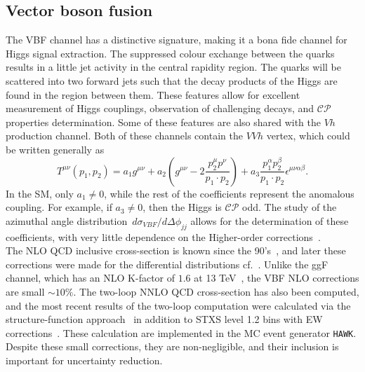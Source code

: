 \subsection{Vector boson fusion}
The VBF channel has a distinctive signature, making it a bona fide channel for Higgs signal extraction. The suppressed colour exchange between the quarks results in a little jet activity in the central rapidity region. The quarks will be scattered into two forward jets such that the decay products of the Higgs are found in the region between them.  These features allow for excellent measurement of Higgs couplings, observation of challenging decays, and $\mathcal{CP}$ properties determination. Some of these features are also shared with the $Vh$ production channel. Both of these channels contain the $VVh$ vertex, which could be written generally as~\cite{LHCHiggsCrossSectionWorkingGroup:2016ypw}
\begin{equation}
	T^{\mu \nu}(p_1,p_2) = a_1 g^{\mu \nu}+ a_2  \left(g^{\mu \nu}- 2\frac{p^\mu_{2} p^\nu }{p_1 \cdot p_2} \right)  + a_3 \frac{p_1^\alpha p_2^ \beta}{p_1 \cdot p_2}\epsilon^{\mu \nu \alpha \beta}. 
\end{equation} 
In the SM, only $a_1\neq0$, while the rest of the coefficients represent the anomalous coupling. For example, if $a_3 \neq0$, then the Higgs is  $\mathcal{CP}$  odd. The study of the azimuthal angle distribution~$d \sigma_{VBF} / d \Delta \phi_{jj}$ allows for the determination of these coefficients, with very little dependence on the Higher-order corrections~\cite{hankele2006anomalous}.\\  The NLO QCD inclusive cross-section is known since the 90's~\cite{Han:1992hr}, and later these corrections were made for the differential distributions cf.~\cite{Figy:2003nv,Berger:2004pca}. Unlike the ggF channel, which has an NLO  K-factor of $1.6$ at 13 TeV~\cite{Gomez-Bock:2007azi}, the VBF NLO corrections are small $\sim 10\%$. The two-loop NNLO QCD cross-section has also been computed, and the most recent results of the two-loop computation were calculated via the structure-function approach~\cite{Bolzoni:2010xr} in addition to STXS level 1.2 bins with EW corrections~\cite{Denner:2014cla}. These calculation are implemented in the MC event generator  \texttt{HAWK}. Despite these small corrections, they are non-negligible, and their inclusion is important for uncertainty reduction.
